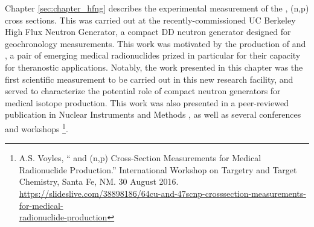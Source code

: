 Chapter \ref{sec:chapter_hfng}  describes the experimental measurement of the , (n,p) cross sections.
This was carried out at the recently-commissioned UC Berkeley High Flux Neutron Generator, a compact DD neutron generator designed  for geochronology measurements.
This work was motivated by the production of   and , a pair of  emerging medical radionuclides prized in particular for their capacity for theranostic applications. 
Notably, the work presented in this chapter was the first scientific measurement to be carried out in this new research facility, and served to characterize the potential role of compact neutron generators for medical isotope production.
This work was also presented in a peer-reviewed publication in Nuclear Instruments and Methods \cite{Voyles2017}, as well as several conferences and workshops \footnotemark[1] \footnotemark[2] \footnotemark[3]  \footnote{A.S. Voyles, \enquote{ and  (n,p) Cross-Section Measurements for Medical Radionuclide Production.}  International Workshop on Targetry and Target Chemistry, Santa Fe, NM. 30 August 2016.\\ \url{https://slideslive.com/38898186/64cu-and-47scnp-crosssection-measurements-for-medical-}\\ \url{radionuclide-production}}.





